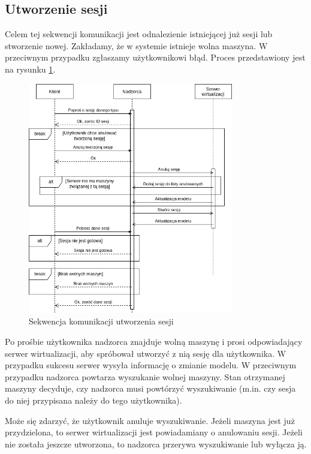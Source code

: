 \documentclass[../opis-rozwiazania.tex]{subfiles}
\begin{document}
\label{communication-sec}

\subsection{Utworzenie sesji}

Celem tej sekwencji komunikacji jest odnalezienie istniejącej już sesji lub stworzenie nowej.
Zakładamy, że w systemie istnieje wolna maszyna.
W przeciwnym przypadku zgłaszamy użytkownikowi błąd. Proces przedstawiony jest na rysunku \ref{figure:diagrams:sequence_diagrams:tworzenie_sesji}.

\begin{figure}[ht!]
  \centering
  \includegraphics[width=0.8\textwidth]{../diagrams/sequence_diagrams/tworzenie_sesji.png}
  \caption{Sekwencja komunikacji utworzenia sesji}
  \label{figure:diagrams:sequence_diagrams:tworzenie_sesji}
\end{figure}

Po prośbie użytkownika nadzorca znajduje wolną maszynę i prosi odpowiadający serwer wirtualizacji, aby spróbował utworzyć z nią sesję dla użytkownika.
W przypadku sukcesu serwer wysyła informację o zmianie modelu.
W przeciwnym przypadku nadzorca powtarza wyszukanie wolnej maszyny.
Stan otrzymanej maszyny decyduje, czy nadzorca musi powtórzyć wyszukiwanie (m.in. czy sesja do niej przypisana należy do tego użytkownika).

Może się zdarzyć, że użytkownik anuluje wyszukiwanie.
Jeżeli maszyna jest już przydzielona, to serwer wirtualizacji jest powiadamiany o anulowaniu sesji.
Jeżeli nie została jeszcze utworzona, to nadzorca przerywa wyszukiwanie lub wyłącza ją.
\end{document}
